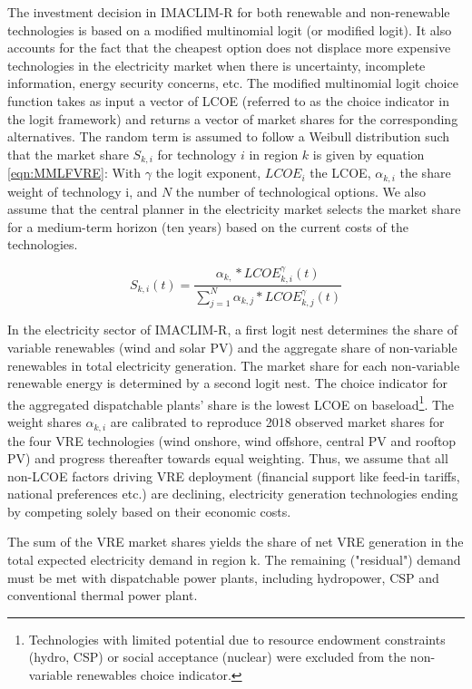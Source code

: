 The investment decision in IMACLIM-R for both renewable and non-renewable technologies is based on a modified multinomial logit (or modified logit). It also accounts for the fact that the cheapest option does not displace more expensive technologies in the electricity market when there is uncertainty, incomplete information, energy security concerns, etc.
The modified multinomial logit choice function takes as input a vector of LCOE (referred to as the choice indicator in the logit framework) and returns a vector of market shares for the corresponding alternatives. The random term is assumed to follow a Weibull distribution such that the market share $S_{k, i}$ for technology $i$ in region $k$ is given by equation \ref{eqn:MMLFVRE}:
With $\gamma$ the logit exponent, $LCOE_{i}$ the LCOE, $\alpha_{k,i}$ the share weight of technology i, and $N$ the number of technological options.
We also assume that the central planner in the electricity market selects the market share for a medium-term horizon (ten years) based on the current costs of the technologies.


\begin{dmath}
    S_{k,i}(t) = \frac{\alpha_{k,}*LCOE_{k,i}^{\gamma}(t)}{\sum_{j=1}^{N} \alpha_{k,j}*LCOE_{k,j}^{\gamma}(t)}
    \label{eqn:MMLFVRE}
\end{dmath}

In the electricity sector of IMACLIM-R, a first logit nest determines the share of variable renewables (wind and solar PV) and the aggregate share of non-variable renewables in total electricity generation. The market share for each non-variable renewable energy is determined by a second logit nest.
The choice indicator for the aggregated dispatchable plants’ share is the lowest LCOE on baseload\footnote{Technologies with limited potential due to resource endowment constraints (hydro, CSP) or social acceptance (nuclear) were excluded from the non-variable renewables choice indicator.}. The weight shares $\alpha_{k,i}$ are calibrated to reproduce 2018 observed market shares for the four VRE technologies (wind onshore, wind offshore, central PV and rooftop PV) and progress thereafter towards equal weighting. Thus, we assume that all non-LCOE factors driving VRE deployment (financial support like feed-in tariffs, national preferences etc.) are declining, electricity generation technologies ending by competing solely based on their economic costs.

The sum of the VRE market shares yields the share of net VRE generation in the total expected electricity demand in region k. The remaining ("residual") demand must be met with dispatchable power plants, including hydropower, CSP and conventional thermal power plant.



